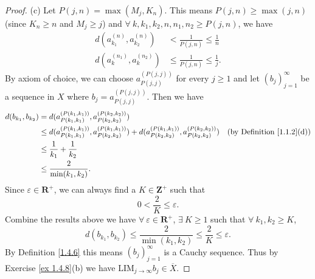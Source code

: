 \begin{proof}{(c)}
    Let \(P(j, n) = \max(M_j, K_n)\).
    This means \(P(j, n) \geq \max(j, n)\) (since \(K_n \geq n\) and \(M_j \geq j\)) and \(\forall\ k, k_1, k_2, n, n_1, n_2 \geq P(j, n)\), we have
    \begin{align*}
        d(a_{k_1}^{(n)}, a_{k_2}^{(n)}) & < \frac{1}{P(j, n)} \leq \frac{1}{n}     \\
        d(a_k^{(n_1)}, a_k^{(n_2)})     & \leq \frac{1}{P(j, n)} \leq \frac{1}{j}.
    \end{align*}
    By axiom of choice, we can choose \(a_{P(j, j)}^{(P(j, j))}\) for every \(j \geq 1\) and let \((b_j)_{j = 1}^\infty\) be a sequence in \(X\) where \(b_j = a_{P(j, j)}^{(P(j, j))}\).
    Then we have
    \begin{align*}
        d(b_{k_1}, b_{k_2}) & = d(a_{P(k_1, k_1)}^{(P(k_1, k_1))}, a_{P(k_2, k_2)}^{(P(k_2, k_2))})                                                                                                                  \\
                            & \leq d(a_{P(k_1, k_1)}^{(P(k_1, k_1))}, a_{P(k_2, k_2)}^{(P(k_1, k_1))}) + d(a_{P(k_2, k_2)}^{(P(k_1, k_1))}, a_{P(k_2, k_2)}^{(P(k_2, k_2))}) & \text{(by Definition \ref{1.1.2}(d))} \\
                            & \leq \frac{1}{k_1} + \frac{1}{k_2}                                                                                                                                                     \\
                            & \leq \frac{2}{\min(k_1, k_2)}.
    \end{align*}
    Since \(\varepsilon \in \mathbf{R}^+\), we can always find a \(K \in \mathbf{Z}^+\) such that
    \[
        0 < \frac{2}{K} \leq \varepsilon.
    \]
    Combine the results above we have \(\forall\ \varepsilon \in \mathbf{R}^+\), \(\exists\ K \geq 1\) such that \(\forall\ k_1, k_2 \geq K\),
    \[
        d(b_{k_1}, b_{k_2}) \leq \frac{2}{\min(k_1, k_2)} \leq \frac{2}{K} \leq \varepsilon.
    \]
    By Definition \ref{1.4.6} this means \((b_j)_{j = 1}^\infty\) is a Cauchy sequence.
    Thus by Exercise \ref{ex 1.4.8}(b) we have \(\text{LIM}_{j \to \infty} b_j \in \overline{X}\).


\end{proof}
